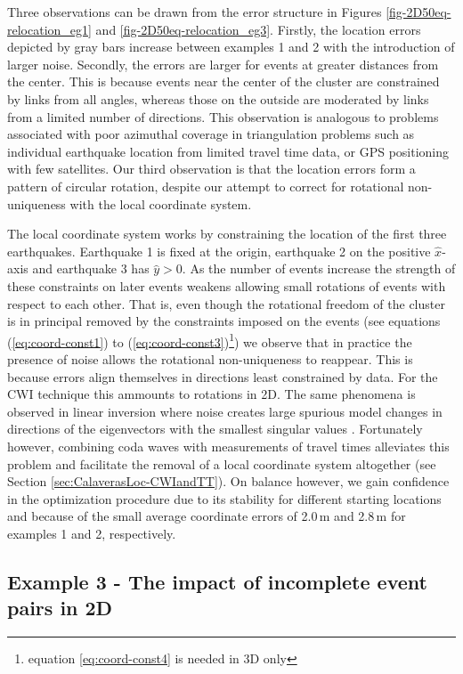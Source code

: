 \documentclass[extra, onecolumn, doublespacing]{gji}
\begin{document}
Three observations can be drawn from the error structure in Figures
\ref{fig-2D50eq-relocation_eg1} and \ref{fig-2D50eq-relocation_eg3}.
Firstly, the location errors depicted by gray bars increase between
examples 1 and 2 with the introduction of larger noise. Secondly,
the errors are larger for events at greater distances from the
center. This is because events near the center of the cluster are
constrained by links from all angles, whereas those on the outside
are moderated by links from a limited number of directions. This
observation is analogous to problems associated with poor azimuthal
coverage in triangulation problems such as individual earthquake
location from limited travel time data, or GPS positioning with few
satellites. Our third observation is that the location errors form a
pattern of circular rotation, despite our attempt to correct for
rotational non-uniqueness with the local coordinate system.

The local coordinate system works by constraining the location of
the first three earthquakes. Earthquake 1 is fixed at the origin,
earthquake 2 on the positive $\hat{x}$-axis and earthquake 3 has
$\hat{y}>0$. As the number of events increase the strength of these
constraints on later events weakens allowing small rotations of
events with respect to each other. That is, even though the
rotational freedom of the cluster is in principal removed by the
constraints imposed on the events (see equations
(\ref{eq:coord-const1}) to (\ref{eq:coord-const3})\footnote{equation
\ref{eq:coord-const4} is needed in 3D only}) we observe that in
practice the presence of noise allows the rotational non-uniqueness
to reappear. This is because errors align themselves in directions
least constrained by data. For the CWI technique this ammounts to rotations in 2D.
The same phenomena is observed in linear inversion where noise
creates large spurious model changes in directions of the
eigenvectors with the smallest singular values \citep{dr_Aster05a}.
 Fortunately however, combining coda waves with
measurements of travel times alleviates this problem and facilitate
the removal of a local coordinate system altogether (see Section
\ref{sec:CalaverasLoc-CWIandTT}). On balance however, we gain
confidence in the optimization procedure due to its stability for
different starting locations and because of the small average
coordinate errors of 2.0\,m and 2.8\,m for examples 1 and 2,
respectively.

\subsection{Example 3 - The impact of incomplete event pairs in 2D}
\end{document}
